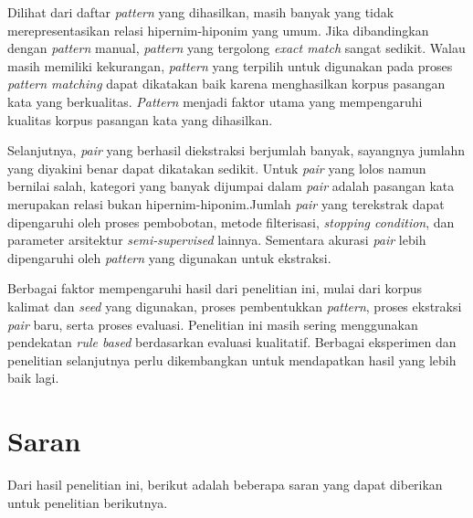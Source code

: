 Dilihat dari daftar \textit{pattern} yang dihasilkan, masih banyak yang tidak merepresentasikan relasi hipernim-hiponim yang umum. Jika dibandingkan dengan \textit{pattern} manual, \textit{pattern} yang tergolong \textit{exact match} sangat sedikit. Walau masih memiliki kekurangan, \textit{pattern} yang terpilih untuk digunakan pada proses \textit{pattern matching} dapat dikatakan baik karena menghasilkan korpus pasangan kata yang berkualitas. \textit{Pattern} menjadi faktor utama yang mempengaruhi kualitas korpus pasangan kata yang dihasilkan.

Selanjutnya, \textit{pair} yang berhasil diekstraksi berjumlah banyak, sayangnya jumlahn yang diyakini benar dapat dikatakan sedikit. Untuk \textit{pair} yang lolos namun bernilai salah, kategori yang banyak dijumpai dalam \textit{pair} adalah pasangan kata merupakan relasi bukan hipernim-hiponim.Jumlah \textit{pair} yang terekstrak dapat dipengaruhi oleh proses pembobotan, metode filterisasi, \textit{stopping condition}, dan parameter arsitektur \textit{semi-supervised} lainnya. Sementara akurasi \textit{pair} lebih dipengaruhi oleh \textit{pattern} yang digunakan untuk ekstraksi. 

Berbagai faktor mempengaruhi hasil dari penelitian ini, mulai dari korpus kalimat dan \textit{seed} yang digunakan, proses pembentukkan \textit{pattern}, proses ekstraksi \textit{pair} baru, serta proses evaluasi. Penelitian ini masih sering menggunakan pendekatan \textit{rule based} berdasarkan evaluasi kualitatif. Berbagai eksperimen dan penelitian selanjutnya perlu dikembangkan untuk mendapatkan hasil yang lebih baik lagi.


\section{Saran}
Dari hasil penelitian ini, berikut adalah beberapa saran yang dapat diberikan untuk penelitian berikutnya.

